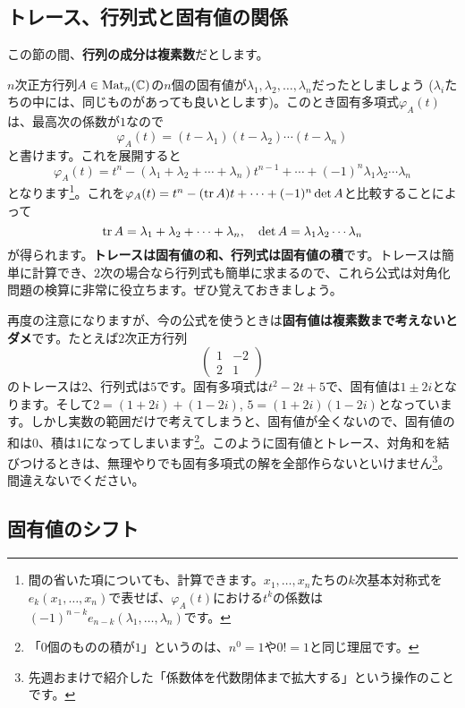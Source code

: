 \subsection{トレース、行列式と固有値の関係}

この節の間、\textbf{行列の成分は複素数}だとします。

$n$次正方行列$A \in \operatorname{Mat}_n(\mathbb{C})$の$n$個の固有値が$\lambda_1, \lambda_2, \ldots, \lambda_n$だったとしましょう ($\lambda_i$たちの中には、同じものがあっても良いとします)。このとき固有多項式$\varphi_A(t)$は、最高次の係数が$1$なので
\[
\varphi_A(t) = (t - \lambda_1) (t - \lambda_2) \cdots (t - \lambda_n)
\]
と書けます。これを展開すると
\[
\varphi_A(t) = t^n - (\lambda_1 + \lambda_2 + \cdots + \lambda_n) t^{n - 1} + \cdots + (-1)^n \lambda_1 \lambda_2 \cdots \lambda_n
\]
となります\footnote{間の省いた項についても、計算できます。$x_1, \ldots, x_n$たちの$k$次基本対称式を$e_k(x_1, \ldots, x_n)$で表せば、$\varphi_A(t)$における$t^k$の係数は$(-1)^{n - k}e_{n - k}(\lambda_1, \ldots, \lambda_n)$です。}。これを$\varphi_A(t) = t^n - (\operatorname{tr} A)t + \cdots + (-1)^n \det A$と比較することによって
\[
\operatorname{tr} A = \lambda_1 + \lambda_2 + \cdots + \lambda_n, \quad
\det A = \lambda_1 \lambda_2 \cdots \lambda_n
\]
が得られます。\textbf{トレースは固有値の和、行列式は固有値の積}です。トレースは簡単に計算でき、$2$次の場合なら行列式も簡単に求まるので、これら公式は対角化問題の検算に非常に役立ちます。ぜひ覚えておきましょう。

再度の注意になりますが、今の公式を使うときは\textbf{固有値は複素数まで考えないとダメ}です。たとえば$2$次正方行列
\[
\begin{pmatrix}
1 & -2 \\
2 & 1
\end{pmatrix}
\]
のトレースは$2$、行列式は$5$です。固有多項式は$t^2 - 2t + 5$で、固有値は$1\pm 2i$となります。そして$2 = (1 + 2i) + (1 - 2i)$, $5 = (1 + 2i)(1 - 2i)$となっています。しかし実数の範囲だけで考えてしまうと、固有値が全くないので、固有値の和は$0$、積は$1$になってしまいます\footnote{「$0$個のものの積が$1$」というのは、$n^0 = 1$や$0! = 1$と同じ理屈です。}。このように固有値とトレース、対角和を結びつけるときは、無理やりでも固有多項式の解を全部作らないといけません\footnote{先週おまけで紹介した「係数体を代数閉体まで拡大する」という操作のことです。}。間違えないでください。

\subsection{固有値のシフト}

